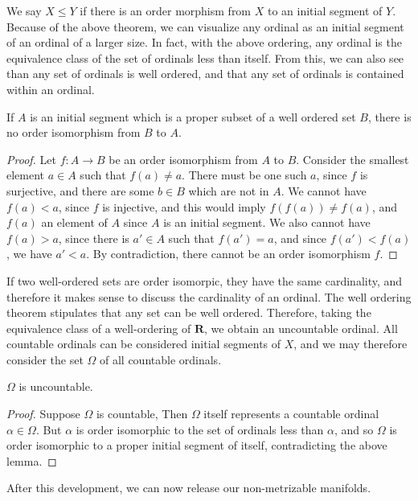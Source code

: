We say $X \leq Y$ if there is an order morphism from $X$ to an initial segment of $Y$. Because of the above theorem, we can visualize any ordinal as an initial segment of an ordinal of a larger size. In fact, with the above ordering, any ordinal is the equivalence class of the set of ordinals less than itself. From this, we can also see than any set of ordinals is well ordered, and that any set of ordinals is contained within an ordinal.

\begin{lemma}
    If $A$ is an initial segment which is a proper subset of a well ordered set $B$, there is no order isomorphism from $B$ to $A$.
\end{lemma}
\begin{proof}
    Let $f:A \to B$ be an order isomorphism from $A$ to $B$. Consider the smallest element $a \in A$ such that $f(a) \neq a$. There must be one such $a$, since $f$ is surjective, and there are some $b \in B$ which are not in $A$. We cannot have $f(a) < a$, since $f$ is injective, and this would imply $f(f(a)) \neq f(a)$, and $f(a)$ an element of $A$ since $A$ is an initial segment. We also cannot have $f(a) > a$, since there is $a' \in A$ such that $f(a') = a$, and since $f(a') < f(a)$, we have $a' < a$. By contradiction, there cannot be an order isomorphism $f$.
\end{proof}

If two well-ordered sets are order isomorpic, they have the same cardinality, and therefore it makes sense to discuss the cardinality of an ordinal. The well ordering theorem stipulates that any set can be well ordered. Therefore, taking the equivalence class of a well-ordering of $\mathbf{R}$, we obtain an uncountable ordinal. All countable ordinals can be considered initial segments of $X$, and we may therefore consider the set $\Omega$ of all countable ordinals.

\begin{theorem}
    $\Omega$ is uncountable.
\end{theorem}
\begin{proof}
    Suppose $\Omega$ is countable, Then $\Omega$ itself represents a countable ordinal $\alpha \in \Omega$. But $\alpha$ is order isomorphic to the set of ordinals less than $\alpha$, and so $\Omega$ is order isomorphic to a proper initial segment of itself, contradicting the above lemma.
\end{proof}

After this development, we can now release our non-metrizable manifolds.

